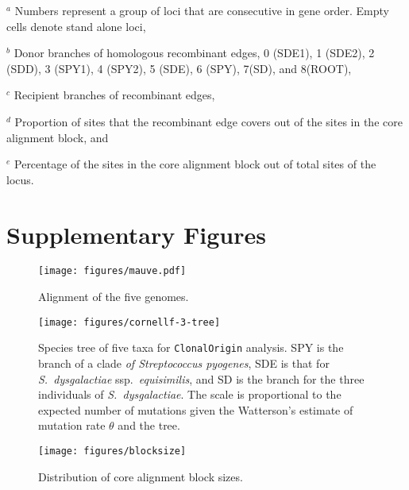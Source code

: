 \documentclass[english]{article}
\begin{document}
\begin{table}
{$^a$ Numbers represent a group of loci that are consecutive in gene order. Empty
cells denote stand alone loci,

$^b$ Donor branches of homologous recombinant edges, 0 (SDE1), 1 (SDE2), 2
(SDD), 3 (SPY1), 4 (SPY2), 5 (SDE), 6 (SPY), 7(SD), and 8(ROOT),

$^c$ Recipient branches of recombinant edges,

$^d$ Proportion of sites that the recombinant edge covers out of the sites in
the core alignment block, and

$^e$ Percentage of the sites in the core alignment block out of total sites of
the locus.
}

\end{table}
\clearpage{}


\section*{Supplementary Figures}

\clearpage{}

\begin{figure}
\begin{center}
\texttt{[image: figures/mauve.pdf]}
\end{center}
\vspace{-1.2in}
\caption{Alignment of the five genomes.}
\label{fig:mauve}
\end{figure}
\clearpage{}

\begin{figure}
\texttt{[image: figures/cornellf-3-tree]}
\caption{\label{fig:tree5}Species tree of five taxa for \texttt{ClonalOrigin} analysis.
SPY is the branch of a clade\textit{ of Streptococcus pyogenes}, SDE
is that for \textit{S.\ dysgalactiae} ssp.\textit{\ equisimilis}, and SD is the
branch for the three individuals of \textit{S.\ dysgalactiae}. The scale is
proportional to the expected number of mutations given the Watterson's estimate 
of mutation
rate $\theta$ and the tree.}
\end{figure}
\clearpage{}%

\begin{figure}
\begin{center}
\texttt{[image: figures/blocksize]}
\end{center}
\vspace{-.3in}
\caption{Distribution of core alignment block sizes.}
\label{fig:blocksize}
\end{figure}
\clearpage{}%
\end{document}
